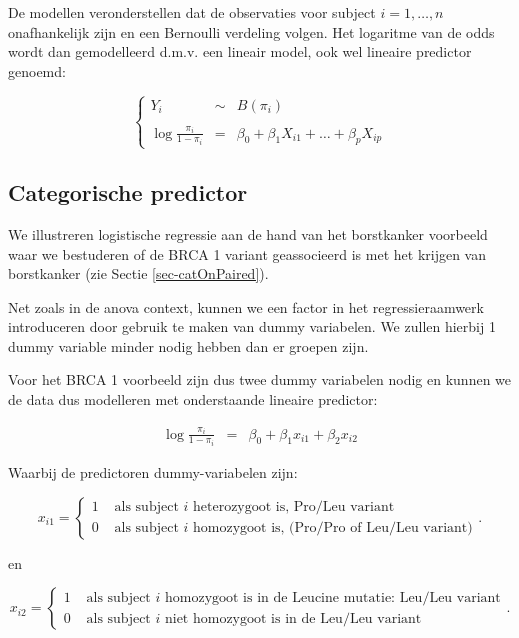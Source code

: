 \documentclass[
  dutch,
  letterpaper,
  12pt]{book}
\theoremstyle{definition}
\theoremstyle{definition}
\theoremstyle{definition}
\theoremstyle{remark}
\begin{document}
De modellen veronderstellen dat de observaties voor subject
\(i=1,\ldots,n\) onafhankelijk zijn en een Bernoulli verdeling volgen.
Het logaritme van de odds wordt dan gemodelleerd d.m.v. een lineair
model, ook wel lineaire predictor genoemd:

\begin{equation}
\left\{
\begin{array}{ccl}
Y_i&\sim&B(\pi_i)\\\\
\log \frac{\pi_i}{1-\pi_i}&=&\beta_0 + \beta_1X_{i1} + \ldots + \beta_p X_{ip}
\end{array}\right.
\end{equation}

\subsection{Categorische predictor}\label{categorische-predictor}

We illustreren logistische regressie aan de hand van het borstkanker
voorbeeld waar we bestuderen of de BRCA 1 variant geassocieerd is met
het krijgen van borstkanker (zie Sectie \ref{sec-catOnPaired}).

Net zoals in de anova context, kunnen we een factor in het
regressieraamwerk introduceren door gebruik te maken van dummy
variabelen. We zullen hierbij 1 dummy variable minder nodig hebben dan
er groepen zijn.

Voor het BRCA 1 voorbeeld zijn dus twee dummy variabelen nodig en kunnen
we de data dus modelleren met onderstaande lineaire predictor:

\begin{eqnarray*}
  \log \frac{\pi_i}{1-\pi_i} &=& \beta_0+\beta_1 x_{i1} +\beta_2 x_{i2}
\end{eqnarray*}

Waarbij de predictoren dummy-variabelen zijn:

\[x_{i1} = \left\{ \begin{array}{ll}
1 & \text{ als subject $i$ heterozygoot is, Pro/Leu variant} \\
0 & \text{ als subject $i$ homozygoot is, (Pro/Pro of Leu/Leu variant)} \end{array}\right. .\]

en

\[x_{i2} = \left\{ \begin{array}{ll}
1 & \text{ als subject $i$ homozygoot is in de Leucine mutatie: Leu/Leu variant} \\
0 & \text{ als subject $i$ niet homozygoot is in de Leu/Leu variant} \end{array}\right. .\]
\end{document}
